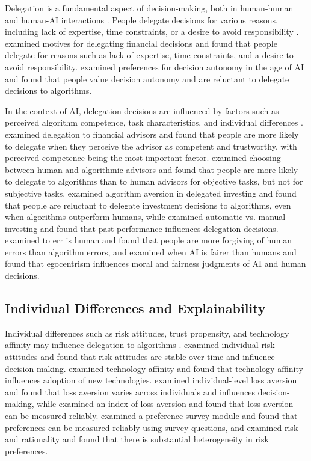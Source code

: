Delegation is a fundamental aspect of decision-making, both in human-human and human-AI interactions \citep{freer2023, ivanovastenzel2025}. People delegate decisions for various reasons, including lack of expertise, time constraints, or a desire to avoid responsibility \citep{freer2023}. \citet{freer2023} examined motives for delegating financial decisions and found that people delegate for reasons such as lack of expertise, time constraints, and a desire to avoid responsibility. \citet{ivanovastenzel2025} examined preferences for decision autonomy in the age of AI and found that people value decision autonomy and are reluctant to delegate decisions to algorithms.

In the context of AI, delegation decisions are influenced by factors such as perceived algorithm competence, task characteristics, and individual differences \citep{holzmeister2023, gazit2023}. \citet{holzmeister2023} examined delegation to financial advisors and found that people are more likely to delegate when they perceive the advisor as competent and trustworthy, with perceived competence being the most important factor. \citet{gazit2023} examined choosing between human and algorithmic advisors and found that people are more likely to delegate to algorithms than to human advisors for objective tasks, but not for subjective tasks. \citet{germann2022} examined algorithm aversion in delegated investing and found that people are reluctant to delegate investment decisions to algorithms, even when algorithms outperform humans, while \citet{kaawach2023} examined automatic vs. manual investing and found that past performance influences delegation decisions. \citet{renier2021} examined to err is human and found that people are more forgiving of human errors than algorithm errors, and \citet{miazek2025} examined when AI is fairer than humans and found that egocentrism influences moral and fairness judgments of AI and human decisions.

\subsection{Individual Differences and Explainability}

Individual differences such as risk attitudes, trust propensity, and technology affinity may influence delegation to algorithms \citep{dohmen2011, franke2019}. \citet{dohmen2011} examined individual risk attitudes and found that risk attitudes are stable over time and influence decision-making. \citet{franke2019} examined technology affinity and found that technology affinity influences adoption of new technologies. \citet{gaechter2022} examined individual-level loss aversion and found that loss aversion varies across individuals and influences decision-making, while \citet{koebberling2005} examined an index of loss aversion and found that loss aversion can be measured reliably. \citet{falk2016} examined a preference survey module and found that preferences can be measured reliably using survey questions, and \citet{bruin2010} examined risk and rationality and found that there is substantial heterogeneity in risk preferences.

